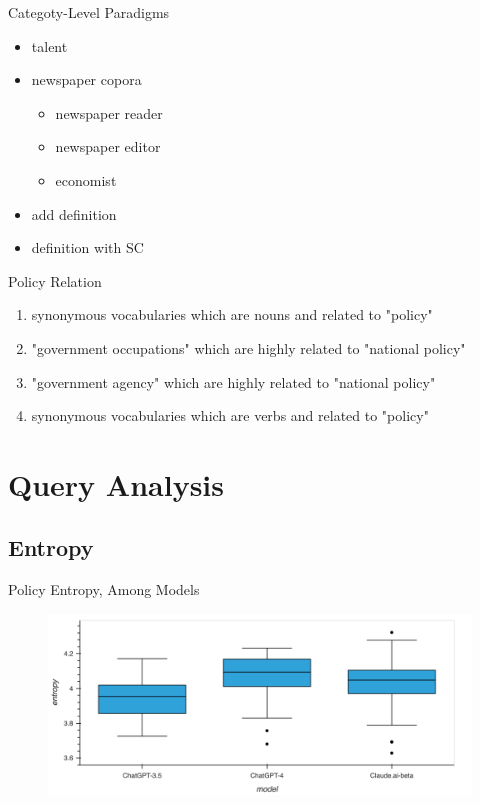 \documentclass[12pt]{beamer}
\begin{document}
\begin{frame}{Categoty-Level Paradigms}
\begin{itemize}
    \item talent
    \item newspaper copora
    \begin{itemize}
        \item newspaper reader
        \item newspaper editor
        \item economist
    \end{itemize}
    \item add definition
    \item definition with SC
\end{itemize}
\end{frame}



\begin{frame}{Policy Relation}
\begin{enumerate}
    \item synonymous vocabularies which are nouns and related to "policy"
    \item "government occupations" which are highly related to "national policy"
    \item "government agency" which are highly related to "national policy"
    \item synonymous vocabularies which are verbs and related to "policy"
\end{enumerate}
\end{frame}


\section{Query Analysis}


\subsection{Entropy}
\begin{frame}{Policy Entropy, Among Models}
\begin{figure}[H]
\centering
\includegraphics[width=11.5cm]{Figures/fig11.png}
\end{figure}
\end{frame}
\end{document}

